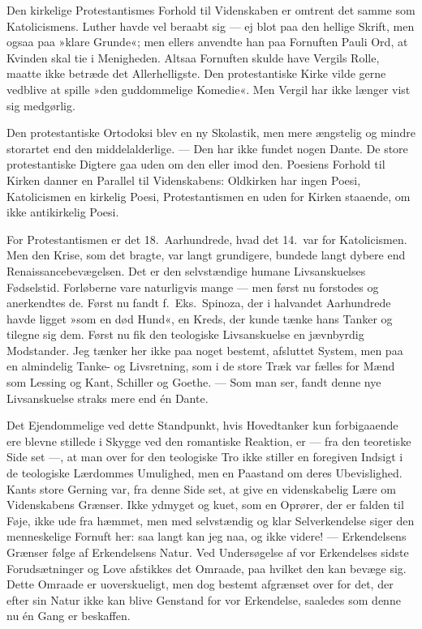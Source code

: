 \documentclass[12pt,a4paper]{article}
\newcommand{\apage}[1]{\marginnote{\footnotesize\textit{[#1]}}}
\begin{document}
Den kirkelige Protestantismes Forhold til Videnskaben er omtrent det samme
som Katolicismens. Luther havde vel beraabt sig --- ej blot paa den hellige
Skrift, men ogsaa paa »klare Grunde«; men ellers anvendte han paa Fornuften
Pauli Ord, at Kvinden skal tie i Menigheden. Altsaa Fornuften skulde have
Vergils Rolle, maatte ikke betræde det Allerhelligste. Den protestantiske
Kirke vilde gerne vedblive at spille »den guddommelige Komedie«. Men Vergil
har ikke længer vist sig medgørlig.

Den protestantiske Ortodoksi blev en ny Skolastik, men mere ængstelig og
mindre storartet end den middelalderlige. --- Den har ikke fundet nogen
Dante. De store protestantiske Digtere gaa uden om den eller imod den.
Poesiens Forhold til Kirken danner en Parallel til Videnskabens: Oldkirken
har ingen Poesi, Katolicismen en kirkelig Poesi, Protestantismen en uden for
Kirken staaende, om ikke antikirkelig Poesi.

For Protestantismen er det 18.\ Aarhundrede, hvad det 14.\ var for
Katolicismen. Men den Krise, som det bragte, var langt grundigere, bundede
langt dybere end Renaissancebevægelsen. Det er den selvstændige humane
Livsanskuelses Fødselstid. Forløberne vare naturligvis mange --- men først
nu forstodes og anerkendtes de. Først nu fandt f.\ Eks.\ Spinoza, der i
halvandet Aarhundrede havde ligget »som en død Hund«, en Kreds, der kunde
tænke hans Tanker og tilegne sig dem. Først nu fik den teologiske
Livsanskuelse en jævnbyrdig Modstander. Jeg tænker her ikke paa noget
bestemt, afsluttet System, men paa en almindelig Tanke- og Livsretning, som
i de store Træk var fælles for Mænd som Lessing og Kant, Schiller og Goethe.
--- Som man ser, fandt denne nye Livsanskuelse straks mere end én Dante.

Det Ejendommelige ved dette \apage{200} Standpunkt, hvis Hovedtanker kun forbigaaende
ere blevne stillede i Skygge ved den romantiske Reaktion, er --- fra den
teoretiske Side set ---, at man over for den teologiske Tro ikke stiller en
foregiven Indsigt i de teologiske Lærdommes Umulighed, men en Paastand om
deres Ubevislighed. Kants store Gerning var, fra denne Side set, at give en
videnskabelig Lære om Videnskabens Grænser. Ikke ydmyget og kuet, som en
Oprører, der er falden til Føje, ikke ude fra hæmmet, men med selvstændig
og klar Selverkendelse siger den menneskelige Fornuft her: saa langt kan jeg
naa, og ikke videre! --- Erkendelsens Grænser følge af Erkendelsens Natur.
Ved Undersøgelse af vor Erkendelses sidste Forudsætninger og Love afstikkes
det Omraade, paa hvilket den kan bevæge sig. Dette Omraade er uoverskueligt,
men dog bestemt afgrænset over for det, der efter sin Natur ikke kan blive
Genstand for vor Erkendelse, saaledes som denne nu én Gang er beskaffen.
\end{document}
